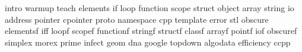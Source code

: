 intro
warmup
teach
elements
if
loop
function
scope
struct
object
array
string
io
address
pointer
cpointer
proto
namespace
cpp
template
error
stl
obscure
elementsf
iff
loopf
scopef
functionf
stringf
structf
classf
arrayf
pointf
iof
obscuref
simplex
morex
prime
infect
geom
dna
google
topdown
algodata
efficiency
ccpp
